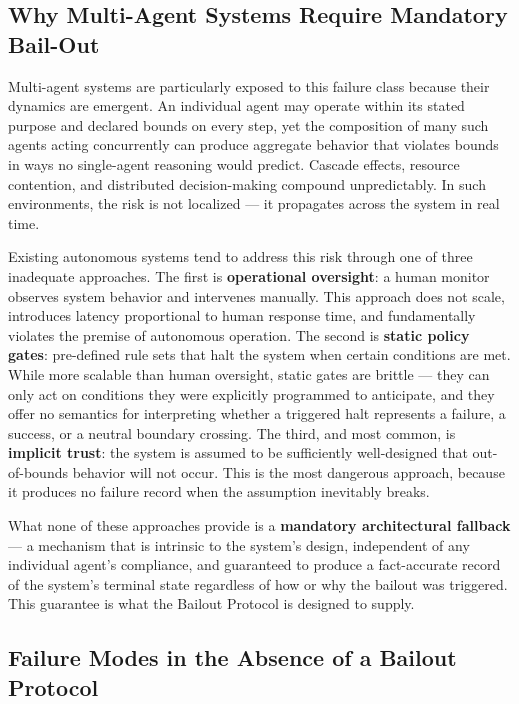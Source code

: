 \subsection{Why Multi-Agent Systems Require Mandatory Bail-Out}

Multi-agent systems are particularly exposed to this failure class because their dynamics are emergent. An individual agent may operate within its stated purpose and declared bounds on every step, yet the composition of many such agents acting concurrently can produce aggregate behavior that violates bounds in ways no single-agent reasoning would predict. Cascade effects, resource contention, and distributed decision-making compound unpredictably. In such environments, the risk is not localized --- it propagates across the system in real time.

Existing autonomous systems tend to address this risk through one of three inadequate approaches. The first is \textbf{operational oversight}: a human monitor observes system behavior and intervenes manually. This approach does not scale, introduces latency proportional to human response time, and fundamentally violates the premise of autonomous operation. The second is \textbf{static policy gates}: pre-defined rule sets that halt the system when certain conditions are met. While more scalable than human oversight, static gates are brittle --- they can only act on conditions they were explicitly programmed to anticipate, and they offer no semantics for interpreting whether a triggered halt represents a failure, a success, or a neutral boundary crossing. The third, and most common, is \textbf{implicit trust}: the system is assumed to be sufficiently well-designed that out-of-bounds behavior will not occur. This is the most dangerous approach, because it produces no failure record when the assumption inevitably breaks.

What none of these approaches provide is a \textbf{mandatory architectural fallback} --- a mechanism that is intrinsic to the system's design, independent of any individual agent's compliance, and guaranteed to produce a fact-accurate record of the system's terminal state regardless of how or why the bailout was triggered. This guarantee is what the Bailout Protocol is designed to supply.

\subsection{Failure Modes in the Absence of a Bailout Protocol}

